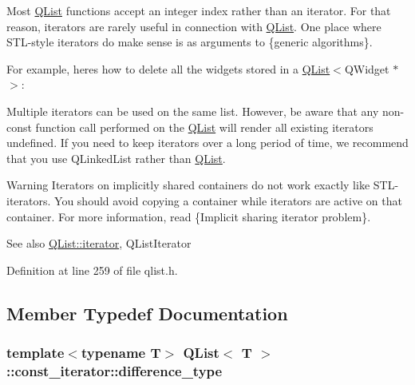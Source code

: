 \begin{DoxyCodeInclude}
\end{DoxyCodeInclude}
 Most \hyperlink{class_q_list}{Q\+List} functions accept an integer index rather than an iterator. For that reason, iterators are rarely useful in connection with \hyperlink{class_q_list}{Q\+List}. One place where S\+T\+L-\/style iterators do make sense is as arguments to \{generic algorithms\}.

For example, here\textquotesingle{}s how to delete all the widgets stored in a \hyperlink{class_q_list}{Q\+List}$<$Q\+Widget $\ast$$>$\+:


\begin{DoxyCodeInclude}
\end{DoxyCodeInclude}
 Multiple iterators can be used on the same list. However, be aware that any non-\/const function call performed on the \hyperlink{class_q_list}{Q\+List} will render all existing iterators undefined. If you need to keep iterators over a long period of time, we recommend that you use Q\+Linked\+List rather than \hyperlink{class_q_list}{Q\+List}.

\begin{DoxyWarning}{Warning}
Iterators on implicitly shared containers do not work exactly like S\+T\+L-\/iterators. You should avoid copying a container while iterators are active on that container. For more information, read \{Implicit sharing iterator problem\}.
\end{DoxyWarning}
\begin{DoxySeeAlso}{See also}
\hyperlink{class_q_list_1_1iterator}{Q\+List\+::iterator}, Q\+List\+Iterator 
\end{DoxySeeAlso}


Definition at line 259 of file qlist.\+h.



\subsection{Member Typedef Documentation}
\subsubsection[{\texorpdfstring{difference\+\_\+type}{difference_type}}]{\setlength{\rightskip}{0pt plus 5cm}template$<$typename T$>$ {\bf Q\+List}$<$ T $>$\+::{\bf const\+\_\+iterator\+::difference\+\_\+type}}\hypertarget{class_q_list_1_1const__iterator_a3fd13f34a4cad0b55bff738b349a87c6}{}\label{class_q_list_1_1const__iterator_a3fd13f34a4cad0b55bff738b349a87c6}


